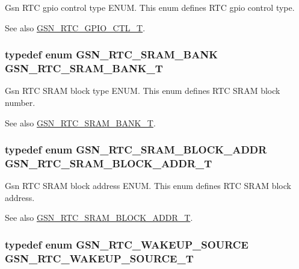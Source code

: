 Gsn RTC gpio control type ENUM. This enum defines RTC gpio control type. 

\begin{DoxySeeAlso}{See also}
\hyperlink{a00651_gaac2b2cc7a6f64a96caddc19f3b3df78b}{GSN\_\-RTC\_\-GPIO\_\-CTL\_\-T}. 
\end{DoxySeeAlso}
\hypertarget{a00651_ga70bc76d00099ffb3dabb49354ff57870}{
\subsubsection[{GSN\_\-RTC\_\-SRAM\_\-BANK\_\-T}]{\setlength{\rightskip}{0pt plus 5cm}typedef enum {\bf GSN\_\-RTC\_\-SRAM\_\-BANK} {\bf GSN\_\-RTC\_\-SRAM\_\-BANK\_\-T}}}
\label{a00651_ga70bc76d00099ffb3dabb49354ff57870}


Gsn RTC SRAM block type ENUM. This enum defines RTC SRAM block number. 

\begin{DoxySeeAlso}{See also}
\hyperlink{a00651_ga70bc76d00099ffb3dabb49354ff57870}{GSN\_\-RTC\_\-SRAM\_\-BANK\_\-T}. 
\end{DoxySeeAlso}
\hypertarget{a00651_ga490147beeb60589ba19b9446b63b0ea0}{
\subsubsection[{GSN\_\-RTC\_\-SRAM\_\-BLOCK\_\-ADDR\_\-T}]{\setlength{\rightskip}{0pt plus 5cm}typedef enum {\bf GSN\_\-RTC\_\-SRAM\_\-BLOCK\_\-ADDR} {\bf GSN\_\-RTC\_\-SRAM\_\-BLOCK\_\-ADDR\_\-T}}}
\label{a00651_ga490147beeb60589ba19b9446b63b0ea0}


Gsn RTC SRAM block address ENUM. This enum defines RTC SRAM block address. 

\begin{DoxySeeAlso}{See also}
\hyperlink{a00651_ga490147beeb60589ba19b9446b63b0ea0}{GSN\_\-RTC\_\-SRAM\_\-BLOCK\_\-ADDR\_\-T}. 
\end{DoxySeeAlso}
\hypertarget{a00651_gaf7c5ef16a16838e7cbfc58bda46355bc}{
\subsubsection[{GSN\_\-RTC\_\-WAKEUP\_\-SOURCE\_\-T}]{\setlength{\rightskip}{0pt plus 5cm}typedef enum {\bf GSN\_\-RTC\_\-WAKEUP\_\-SOURCE} {\bf GSN\_\-RTC\_\-WAKEUP\_\-SOURCE\_\-T}}}
\label{a00651_gaf7c5ef16a16838e7cbfc58bda46355bc}


